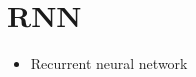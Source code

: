 \documentclass[a4paper]{article}
\begin{document}
\section{RNN}
\begin{itemize}
    \item Recurrent neural network
\end{itemize}
\end{document}
